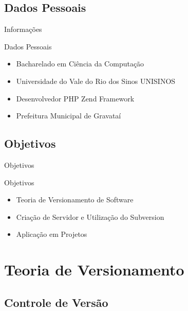 \documentclass[hyperref={pdfpagelabels=false}]{beamer}
\begin{document}
\subsection{Dados Pessoais}

\begin{frame}{Informações}
    \begin{block}{Dados Pessoais}
        \begin{itemize}
          \item Bacharelado em Ciência da Computação
          \item Universidade do Vale do Rio dos Sinos UNISINOS
          \item Desenvolvedor PHP Zend Framework
          \item Prefeitura Municipal de Gravataí
        \end{itemize}
    \end{block}
\end{frame}

\subsection{Objetivos}

\begin{frame}{Objetivos}
    \begin{block}{Objetivos}
        \begin{itemize}
            \item Teoria de Versionamento de Software
            \item Criação de Servidor e Utilização do Subversion
            \item Aplicação em Projetos
        \end{itemize}
    \end{block}
\end{frame}

\section{Teoria de Versionamento}
\label{sec:teoria}

\subsection{Controle de Versão}
\end{document}
